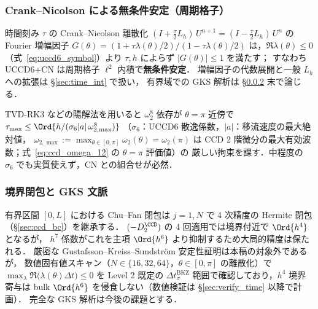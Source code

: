 \subsubsection{Crank--Nicolson による無条件安定（周期格子）}
\label{sec:uccd6_cn_stability}

時間刻み $\tau$ の Crank--Nicolson 離散化
$(I + \tfrac{\tau}{2}L_h)\,U^{n+1} = (I - \tfrac{\tau}{2}L_h)\,U^{n}$
の Fourier 増幅因子
$G(\theta) = (1+\tau\lambda(\theta)/2)/(1-\tau\lambda(\theta)/2)$
は，$\Re\lambda(\theta)\le 0$（式~\eqref{eq:uccd6_symbol}）より
$\tau, h$ によらず $|G(\theta)|\le 1$ を満たす；
すなわち UCCD6+CN は周期格子 $\ell^2$ 内積で\textbf{無条件安定}．
増幅因子の代数展開と一般 $L_h$ への拡張は §\ref{sec:time_int} で扱い，
有界域での GKS 解析は §\ref{sec:uccd6_boundary} 末で論じる．

\begin{remark}
\label{rem:uccd6_explicit_cfl}
TVD-RK3 などの陽解法を用いると $\omega_2^8$ 依存が $\theta=\pi$ 近傍で
$\tau_{\max}\le \Ord{h/(\sigma_6|a|\,\omega_{2,\max}^8)}$
（$\sigma_6$：UCCD6 散逸係数，$|a|$：移流速度の最大絶対値，
$\omega_{2,\max} := \max_{\theta\in[0,\pi]}\omega_2(\theta) = \omega_2(\pi)$ は
CCD 2 階微分の最大有効波数；式~\eqref{eq:ccd_omega_12} の $\theta=\pi$ 評価値）の
厳しい拘束を課す．中程度の $\sigma_6$ でも実質使えず，CN との組合せが必然．
\end{remark}

\subsubsection{境界閉包と GKS 文脈}
\label{sec:uccd6_boundary}

有界区間 $[0,L]$ における Chu--Fan 閉包は
$j=1, N$ で 4 次精度の Hermite 閉包（§\ref{sec:ccd_bc}）を継承する．
$(-D_2^{\CCD})$ の 4 回適用では境界付近で $\Ord{h^4}$ となるが，
$h^7$ 係数がこれを主項 $\Ord{h^6}$ より抑制するため大局的精度は保たれる．
厳密な Gustafsson--Kreiss--Sundstr\"om 安定性証明は本稿の対象外であるが，
数値固有値スキャン（$N\in\{16,32,64\}$，$\theta\in[0,\pi]$ の離散化）で
$\max_\lambda\Re\bigl(\lambda(\theta)\Delta t\bigr)\le 0$ を Level 2 既定の
$\Delta t_\sigma^\text{BKZ}$ 範囲で確認しており，$h^4$ 境界寄与は
bulk $\Ord{h^6}$ を侵食しない（数値検証は §\ref{sec:verify_time} 以降で計画）．
完全な GKS 解析は今後の課題とする．

